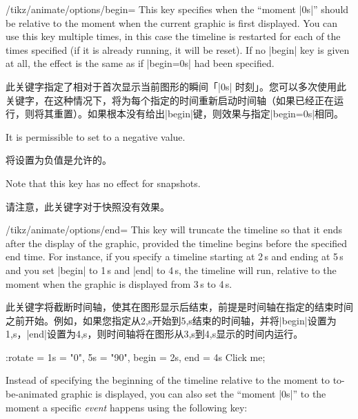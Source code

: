 \begin{key}{/tikz/animate/options/begin=}
    This key specifies when the ``moment |0s|'' should be relative to the
    moment when the current graphic is first displayed. You can use this key
    multiple times, in this case the timeline is restarted for each of the
    times specified (if it is already running, it will be reset). If no |begin|
    key is given at all, the effect is the same as if |begin=0s| had been
    specified.

    此关键字指定了相对于首次显示当前图形的瞬间「|0s| 时刻」。您可以多次使用此关键字，在这种情况下，将为每个指定的时间重新启动时间轴（如果已经正在运行，则将其重置）。如果根本没有给出|begin|键，则效果与指定|begin=0s|相同。



    It is permissible to set  to a negative value.

    将设置为负值是允许的。



    Note that this key has no effect for snapshots.

    请注意，此关键字对于快照没有效果。


\end{key}

\begin{key}{/tikz/animate/options/end=}
    This key will truncate the timeline so that it ends  after the
    display of the graphic, provided the timeline begins before the specified
    end time. For instance, if you specify a timeline starting at 2\,s and
    ending at 5\,s and you set |begin| to 1\,s and |end| to 4\,s, the timeline
    will run, relative to the moment when the graphic is displayed from 3\,s to
    4\,s.
    
    此关键字将截断时间轴，使其在图形显示后结束，前提是时间轴在指定的结束时间之前开始。例如，如果您指定从2,s开始到5,s结束的时间轴，并将|begin|设置为1,s，|end|设置为4,s，则时间轴将在图形从3,s到4,s显示的时间内运行。


\begin{codeexample}[preamble={\usetikzlibrary{animations}}]
\tikz \node [fill = green!50!black, text = white]
    :rotate = { 1s = "0", 5s = "90", begin = 2s, end = 4s }
  {Click me};
\end{codeexample}
\end{key}

Instead of specifying the beginning of the timeline relative to the moment to
to-be-animated graphic is displayed, you can also set the ``moment |0s|'' to
the moment a specific \emph{event} happens using the following key:

